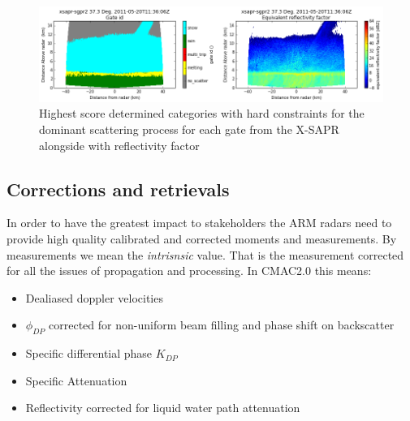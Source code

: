 \documentclass[twocol]{ametsoc}
\begin{document}
\begin{figure}[h]
    \centering
    \includegraphics[width=0.95\columnwidth]{xsaprfuz.png}
    \caption{Highest score determined categories with hard constraints for the dominant scattering process for each gate from the X-SAPR alongside with reflectivity factor }
    \label{fig:xfuz}
\end{figure}


\subsection{Corrections and retrievals}
In order to have the greatest impact to stakeholders the ARM radars need to provide high quality calibrated and corrected moments and measurements. By measurements we mean the {\it intrisnsic} value. 
That is the measurement corrected for all the issues of propagation and processing. In CMAC2.0 this means:
\begin{itemize}  
\item Dealiased doppler velocities 
\item $\phi_{DP}$ corrected for non-uniform beam filling and phase shift on backscatter
\item Specific differential phase $K_{DP}$
\item Specific Attenuation 
\item Reflectivity corrected for liquid water path attenuation
\end{itemize}
\end{document}
